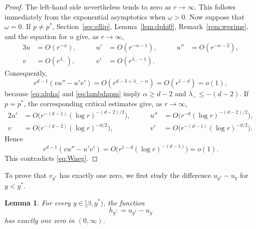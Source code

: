 \documentclass[12pt, a4paper, reqno]{amsart}
\numberwithin{equation}{section}
\newtheorem{lemma}[theorem]{Lemma}
\theoremstyle{definition}
\theoremstyle{remark}
\newcommand{\ce}{\mathrel{\mathop:}=}
\begin{document}
\begin{proof}
The left-hand side nevertheless tends to zero as $r\to\infty$. This follows
immediately from the exponential asymptotics when $\omega>0$. Now suppose that $\omega=0$. If $p\ne p^*$,
Section~\ref{sec:ellip}, Lemma~\ref{lem:dphi0},
Remark~\ref{rem:wprime}, and the equation for $u$ give, as
$r\to\infty$,
\begin{alignat*}{3}
  u&=O(r^{-\alpha}),\qquad
  &u'&=O(r^{-\alpha-1}),\qquad
  &u''&=O(r^{-\alpha-2}),\\
  v&=O(r^{\lambda_-}),\qquad
  &v'&=O(r^{\lambda_--1}).
\end{alignat*}
Consequently,
\begin{equation}\label{eq:Wdec-nc}
  r^{d-1}(vu''-u'v')
  =O(r^{d-3+\lambda_--\alpha})=O(r^{1-d})=o(1),
\end{equation}
because \eqref{eq:alpha} and \eqref{eq:lambdapm} imply
$\alpha\ge d-2$ and $\lambda_-\le-(d-2)$. If $p=p^*$, the corresponding
critical estimates give, as $r\to\infty$,
\begin{alignat*}{2}
  u'&=O\bigl(r^{-(d-1)}(\log r)^{-(d-2)/2}\bigr),\qquad
  &u''&=O\bigl(r^{-d}(\log r)^{-(d-2)/2}\bigr),\\
  v&=O\bigl(r^{-(d-2)}(\log r)^{-d/2}\bigr),\qquad
  &v'&=O\bigl(r^{-(d-1)}(\log r)^{-d/2}\bigr).
\end{alignat*}
Hence
\begin{equation}\label{eq:Wdec-c}
  r^{d-1}(vu''-u'v')
  =O\bigl(r^{1-d}(\log r)^{-(d-1)}\bigr)=o(1).
\end{equation}
This contradicts \eqref{eq:Wneg}.
\end{proof}
To prove that $v_{y^*}$ has exactly one zero,
we first study the difference $u_{y^*}-u_y$
for $y<y^*$.
\begin{lemma}\label{lem:hzero}
For every $y\in[\beta,y^*)$, the function
\[
  h_y\ce u_{y^*}-u_y
\]
has exactly one zero in $(0,\infty)$.
\end{lemma}
\end{document}
